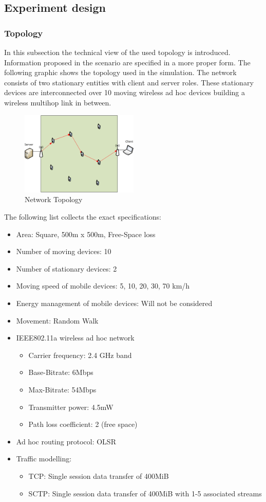 \documentclass[a4paper]{article}
\begin{document}
\subsection{Experiment design}
\subsubsection{Topology}
In this subsection the technical view of the used topology is introduced. Information proposed in the scenario are specified in a more proper form. The following graphic shows the topology used in the simulation. The network consists of two stationary entities with client and server roles. These stationary devices are interconnected over 10 moving wireless ad hoc devices building a wireless multihop link in between.
\begin{figure}[H]
	\centering
	\includegraphics[width=0.5\textwidth]{imgs/Topology}
	\caption{Network Topology}
	\label{fig:topology}
\end{figure}
\pagebreak
The following list collects the exact specifications:
\begin{itemize}
	\item Area: Square, 500m x 500m, Free-Space loss
	\item Number of moving devices: 10
	\item Number of stationary devices: 2
	\item Moving speed of mobile devices: 5, 10, 20, 30, 70 km/h
	\item Energy management of mobile devices: Will not be considered
	\item Movement: Random Walk
	\item IEEE802.11a wireless ad hoc network
	\begin{itemize}
		\item Carrier frequency: 2.4 GHz band
		\item Base-Bitrate: 6Mbps
		\item Max-Bitrate: 54Mbps
		\item Transmitter power: 4.5mW
		\item Path loss coefficient: 2 (free space)
	\end{itemize}
	\item Ad hoc routing protocol: OLSR
	\item Traffic modelling: 
	\begin{itemize}
		\item TCP: Single session data transfer of 400MiB
		\item SCTP: Single session data transfer of 400MiB with 1-5 associated streams 
	\end{itemize}
\end{itemize}			
\end{document}

